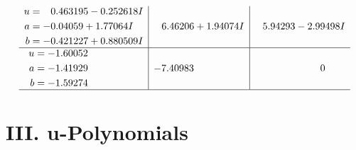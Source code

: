 \documentclass[1p]{elsarticle_modified}
\theoremstyle{definition}
\begin{document}
$$\begin{array}{c|c|c}
\begin{aligned}
u &= \phantom{-}0.463195 - 0.252618 I \\
a &= -0.04059 + 1.77064 I \\
b &= -0.421227 + 0.880509 I\end{aligned}
 & \phantom{-}6.46206 + 1.94074 I & \phantom{-}5.94293 - 2.99498 I \\ \hline\begin{aligned}
u &= -1.60052\phantom{ +0.000000I} \\
a &= -1.41929\phantom{ +0.000000I} \\
b &= -1.59274\phantom{ +0.000000I}\end{aligned}
 & -7.40983\phantom{ +0.000000I} & \phantom{-0.000000 } 0\\
 \hline 
 \end{array}$$\newpage
\newpage\renewcommand{\arraystretch}{1}
\centering \section*{ III. u-Polynomials}
\end{document}

